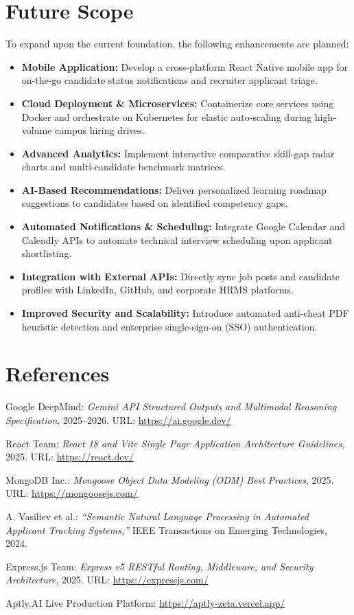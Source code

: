 \documentclass[12pt, a4paper]{article}
\begin{document}
\section{Future Scope}
To expand upon the current foundation, the following enhancements are planned:
\begin{itemize}[leftmargin=1.5em, itemsep=2.5pt]
    \item \textbf{Mobile Application:} Develop a cross-platform React Native mobile app for on-the-go candidate status notifications and recruiter applicant triage.
    \item \textbf{Cloud Deployment \& Microservices:} Containerize core services using Docker and orchestrate on Kubernetes for elastic auto-scaling during high-volume campus hiring drives.
    \item \textbf{Advanced Analytics:} Implement interactive comparative skill-gap radar charts and multi-candidate benchmark matrices.
    \item \textbf{AI-Based Recommendations:} Deliver personalized learning roadmap suggestions to candidates based on identified competency gaps.
    \item \textbf{Automated Notifications \& Scheduling:} Integrate Google Calendar and Calendly APIs to automate technical interview scheduling upon applicant shortlisting.
    \item \textbf{Integration with External APIs:} Directly sync job posts and candidate profiles with LinkedIn, GitHub, and corporate HRMS platforms.
    \item \textbf{Improved Security and Scalability:} Introduce automated anti-cheat PDF heuristic detection and enterprise single-sign-on (SSO) authentication.
\end{itemize}

\section{References}
\begin{enumerate}[label={[\arabic*]}, leftmargin=2em, itemsep=2.5pt]
    \item Google DeepMind: \textit{Gemini API Structured Outputs and Multimodal Reasoning Specification}, 2025--2026. URL: \url{https://ai.google.dev/}
    \item React Team: \textit{React 18 and Vite Single Page Application Architecture Guidelines}, 2025. URL: \url{https://react.dev/}
    \item MongoDB Inc.: \textit{Mongoose Object Data Modeling (ODM) Best Practices}, 2025. URL: \url{https://mongoosejs.com/}
    \item A. Vasiliev et al.: \textit{``Semantic Natural Language Processing in Automated Applicant Tracking Systems,''} IEEE Transactions on Emerging Technologies, 2024.
    \item Express.js Team: \textit{Express v5 RESTful Routing, Middleware, and Security Architecture}, 2025. URL: \url{https://expressjs.com/}
    \item Aptly.AI Live Production Platform: \url{https://aptly-zeta.vercel.app/}
\end{enumerate}
\end{document}
